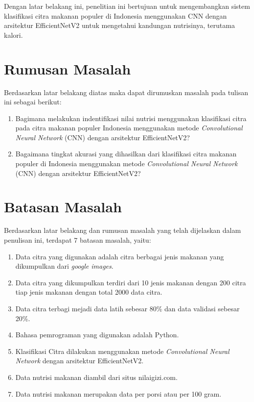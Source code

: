 Dengan latar belakang ini, penelitian ini bertujuan untuk mengembangkan sistem klasifikasi citra makanan populer di Indonesia menggunakan CNN dengan arsitektur EfficientNetV2 untuk mengetahui kandungan nutrisinya, terutama kalori.

\section{Rumusan Masalah}
Berdasarkan latar belakang diatas maka dapat dirumuskan masalah pada tulisan ini sebagai berikut:
\begin{enumerate}
    \item Bagimana melakukan indentifikasi nilai nutrisi menggunakan klasifikasi citra pada citra makanan populer Indonesia menggunakan metode \textit{Convolutional Neural Network} (CNN) dengan arsitektur EfficientNetV2?
    \item Bagaimana tingkat akurasi yang dihasilkan dari klasifikasi citra makanan populer di Indonesia menggunakan metode \textit{Convolutional Neural Network} (CNN) dengan arsitektur EfficientNetV2?
\end{enumerate}

\section{Batasan Masalah}
Berdasarkan latar belakang dan rumusan masalah yang telah dijelaskan dalam penulisan ini, terdapat 7 batasan masalah, yaitu:
\begin{enumerate}
    \item Data citra yang digunakan adalah citra berbagai jenis makanan yang dikumpulkan dari \textit{google images}.
    \item Data citra yang dikumpulkan terdiri dari 10 jenis makanan dengan 200 citra tiap jenis makanan dengan total 2000 data citra.
    \item Data citra terbagi mejadi data latih sebesar 80\% dan data validasi sebesar 20\%.
    \item Bahasa pemrograman yang digunakan adalah Python.
    \item Klasifikasi Citra dilakukan menggunakan metode \textit{Convolutional Neural Network} dengan arsitektur EfficientNetV2.
    \item Data nutrisi makanan diambil dari situs nilaigizi.com.
    \item Data nutrisi makanan merupakan data per porsi atau per 100 gram.
\end{enumerate}

